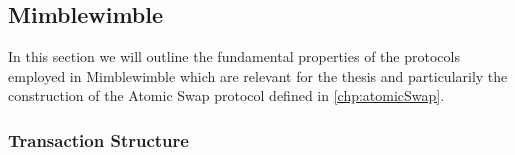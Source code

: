 \subsection{Mimblewimble}\label{sec:Mimblewimble}
In this section we will outline the fundamental properties of the protocols employed in Mimblewimble which are relevant for the thesis and particularily the construction of the Atomic Swap protocol defined in
\ref{chp:atomicSwap}.
\subsubsection{Transaction Structure}

